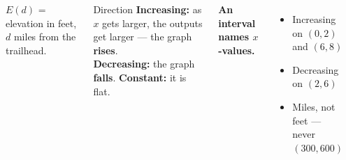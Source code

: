 \documentclass[aspectratio=169, 11pt]{beamer}
\newcommand{\trailcurve}{(0,3) .. controls (0.6,4.6) and (1.2,6) .. (2,6)
  .. controls (4,6) and (4,2) .. (6,2) .. controls (6.8,2) and (7.4,4) .. (8,7)}
\newcommand{\trailaxes}{%
  \draw[linegray, very thin, step=1] (0,0) grid (8,8);
  \draw[->, thick] (0,0) -- (8.6,0) node[below right] {\small $d$};
  \draw[->, thick] (0,0) -- (0,8.6) node[above] {\small $E(d)$};
  \foreach \x in {1,...,8} \node[below, font=\scriptsize] at (\x,0) {\x};
  \foreach \y/\l in {2/200,4/400,6/600,8/800} \node[left, font=\scriptsize] at (0,\y) {\l};}
\begin{document}
\begin{frame}[t, plain]

  \begin{columns}[T]
      \begin{center}
      \end{center}
      {\footnotesize $E(d)$ = elevation in feet, $d$ miles from the trailhead.}

      \begin{block}{Direction}
        \textbf{Increasing:} as $x$ gets larger, the outputs get larger --- the graph
        \textbf{rises}.\\[3pt]
        \textbf{Decreasing:} the graph \textbf{falls}. \textbf{Constant:} it is flat.
      \end{block}

      \medskip
      \textbf{An interval names $x$-values.}
      \begin{itemize}\setlength{\itemsep}{4pt}
        \item Increasing on $(0, 2)$ and $(6, 8)$
        \item Decreasing on $(2, 6)$
        \item Miles, not feet --- never $(300, 600)$
      \end{itemize}
  \end{columns}
\end{frame}
\end{document}
